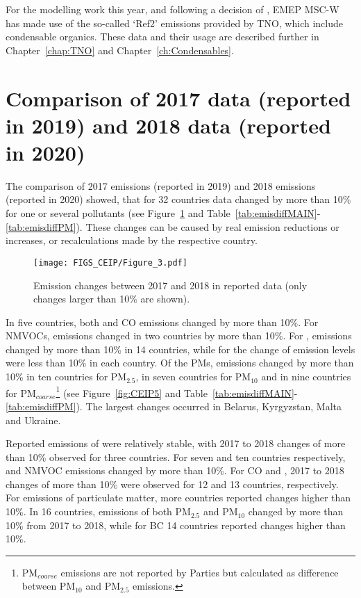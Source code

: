 %
For the modelling work this year, and following a decision of \citet{EMEPBureaux2020}, EMEP MSC-W has made use of the so-called `Ref2' emissions provided by TNO, which include condensable organics. These data and their usage are described further in  Chapter~\ref{chap:TNO} and Chapter~\ref{ch:Condensables}.


\section[Comparison of 2017 and 2018]{Comparison of 2017 data (reported in 2019) and 2018 data (reported in 2020)}
\label{emischanges}

The comparison of 2017 emissions (reported in 2019) and 2018 emissions
(reported in 2020) showed, that for 32 countries data changed by more
than 10\% for one or several pollutants (see Figure~\ref{fig:CEIP3} and Table~\ref{tab:emisdiffMAIN}-\ref{tab:emisdiffPM}).
These changes can be caused by real emission reductions or increases, or recalculations made by the respective country.

\begin{figure}[h]
\centering
{\texttt{[image: FIGS\_CEIP/Figure\_3.pdf]}}
\caption{Emission changes between 2017 and 2018 in reported data (only changes larger than 10\% are shown).
}
\label{fig:CEIP3}
\end{figure}

In five countries, both \nox and CO emissions changed by more than 10\%. For NMVOCs, emissions changed in two countries by more than 10\%. For \sox, emissions changed by more than 10\% in 14 countries, while for \nhiii the change of emission levels were less than 10\% in each country. Of the PMs, emissions changed by more than 10\% in ten countries for PM$_{2.5}$, in seven countries for PM$_{10}$ and in nine countries for PM$_{coarse}$\footnote{PM$_{coarse}$ emissions are not reported by Parties but calculated as difference between PM$_{10}$ and PM$_{2.5}$ emissions.} (see Figure~\ref{fig:CEIP5} and Table~\ref{tab:emisdiffMAIN}-\ref{tab:emisdiffPM}). The largest changes occurred in Belarus, Kyrgyzstan, Malta and Ukraine.

Reported emissions of \nox were relatively stable, with 2017 to 2018 changes of more than 10\% observed for three countries. For seven and ten countries respectively, \nhiii and NMVOC emissions changed by more than 10\%. For CO and \sox, 2017 to 2018 changes of more than 10\% were observed for 12 and 13 countries, respectively. For emissions of particulate matter, more countries reported changes higher than 10\%. In 16 countries, emissions of both  PM$_{2.5}$ and PM$_{10}$ changed by more than 10\% from 2017 to 2018, while for BC  14 countries reported changes higher than 10\%.


